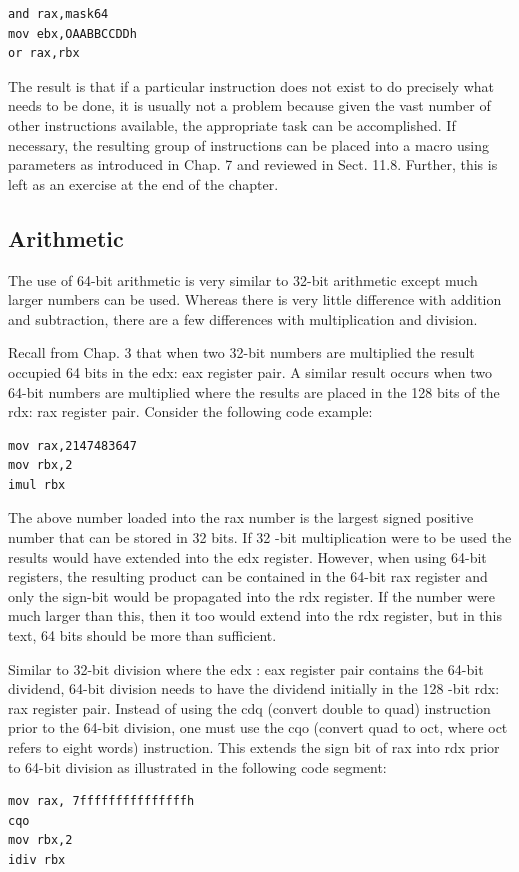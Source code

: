 \documentclass[10pt]{book}
\begin{document}
\begin{verbatim}
and rax,mask64
mov ebx,OAABBCCDDh
or rax,rbx
\end{verbatim}

The result is that if a particular instruction does not exist to do precisely what needs to be done, it is usually not a problem because given the vast number of other instructions available, the appropriate task can be accomplished. If necessary, the resulting group of instructions can be placed into a macro using parameters as introduced in Chap. 7 and reviewed in Sect. 11.8. Further, this is left as an exercise at the end of the chapter.

\subsection{Arithmetic}
The use of 64-bit arithmetic is very similar to 32-bit arithmetic except much larger numbers can be used. Whereas there is very little difference with addition and subtraction, there are a few differences with multiplication and division.

Recall from Chap. 3 that when two 32-bit numbers are multiplied the result occupied 64 bits in the edx: eax register pair. A similar result occurs when two 64-bit numbers are multiplied where the results are placed in the 128 bits of the rdx: rax register pair. Consider the following code example:

\begin{verbatim}
mov rax,2147483647
mov rbx,2
imul rbx
\end{verbatim}

The above number loaded into the rax number is the largest signed positive number that can be stored in 32 bits. If 32 -bit multiplication were to be used the results would have extended into the edx register. However, when using 64-bit registers, the resulting product can be contained in the 64-bit rax register and only the sign-bit would be propagated into the rdx register. If the number were much larger than this, then it too would extend into the rdx register, but in this text, 64 bits should be more than sufficient.

Similar to 32-bit division where the edx : eax register pair contains the 64-bit dividend, 64-bit division needs to have the dividend initially in the 128 -bit rdx:\\
rax register pair. Instead of using the cdq (convert double to quad) instruction prior to the 64-bit division, one must use the cqo (convert quad to oct, where oct refers to eight words) instruction. This extends the sign bit of rax into rdx prior to 64-bit division as illustrated in the following code segment:
\begin{verbatim}
mov rax, 7fffffffffffffffh
cqo
mov rbx,2
idiv rbx
\end{verbatim}
\end{document}
